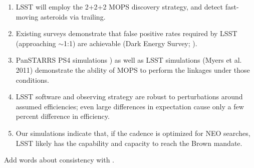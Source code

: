 \documentclass[12pt,preprint]{aastex}
\begin{document}
\begin{enumerate}
\item LSST will employ the 2+2+2 MOPS discovery strategy, and detect fast-moving asteroids via trailing.
\item Existing surveys demonstrate that false positive rates required
  by LSST (approaching $\sim$1:1) are  achievable (Dark Energy Survey;  \citep{goldstein2015}).
\item PanSTARRS PS4 simulations \citep{denneau13}) as well as LSST
  simulations (Myers et al. 2011) demonstrate the ability of MOPS to perform the linkages under those conditions.
\item LSST software and observing strategy are robust to perturbations
  around assumed efficiencies; even large differences in expectation
  cause only a few percent difference in efficiency. 
\item Our simulations indicate that, if the cadence is optimized for
          NEO searches, LSST likely has the capability and capacity to reach the Brown mandate.
\end{enumerate}

Add words about consistency with \cite{GMS2016}. 

\appendix
 





\end{document}
